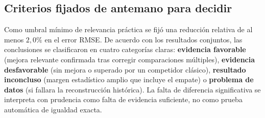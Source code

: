 \subsection{Criterios fijados de antemano para decidir}

Como umbral mínimo de relevancia práctica se fijó una reducción relativa de al menos \(2{,}0\%\) en el error RMSE. De acuerdo con los resultados conjuntos, las conclusiones se clasificaron en cuatro categorías claras: \textbf{evidencia favorable} (mejora relevante confirmada tras corregir comparaciones múltiples), \textbf{evidencia desfavorable} (sin mejora o superado por un competidor clásico), \textbf{resultado inconcluso} (margen estadístico amplio que incluye el empate) o \textbf{problema de datos} (si fallara la reconstrucción histórica). La falta de diferencia significativa se interpreta con prudencia como falta de evidencia suficiente, no como prueba automática de igualdad exacta.
